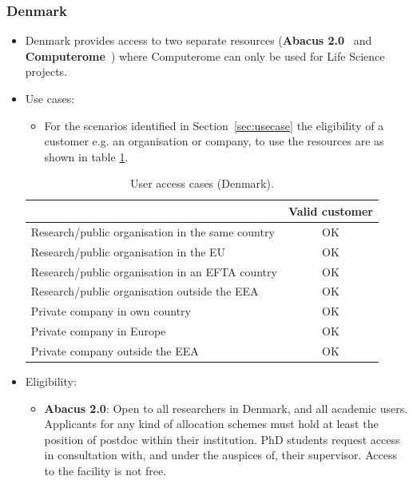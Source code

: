 \documentclass{article}
\begin{document}
\subsubsection{Denmark}
\begin{itemize}
    \item []
Denmark provides access to two separate resources (\textbf{Abacus 2.0}~\cite{abacus} and \textbf{Computerome}~\cite{computerome}) where Computerome can only be used for Life Science projects. 

    \item[] Use cases: 
    \begin{itemize}
        \item[] 
    For the scenarios identified in Section~\ref{sec:usecase} the eligibility of a customer e.g. an organisation or company, to use the resources are as shown in table \ref{tab:DK_use_cases}.
    \end{itemize}
    \begin{table}[!h]
        \centering
        \begin{tabular}{|l|c|}
        \hline
             & Valid customer  \\
        \hline
Research/public organisation in the same country & OK \\
        \hline
Research/public organisation in the EU & OK \\
        \hline
Research/public organisation in an EFTA country & OK \\
        \hline
Research/public organisation outside the EEA & OK\\
        \hline
Private company in own country & OK \\
        \hline
Private company in Europe    & OK \\
        \hline
Private company outside the EEA & OK \\
        \hline 
        \end{tabular}
        \caption{User access cases (Denmark).}
        \label{tab:DK_use_cases}
    \end{table}
    
    \item[]Eligibility:
    \begin{itemize} 
        \item[]\textbf{Abacus 2.0}: Open to all researchers in Denmark, and all academic users. Applicants for any kind of allocation schemes must hold at least the position of postdoc within their institution. PhD students request access in consultation with, and under the auspices of, their supervisor. Access to the facility is not free. 
        

\end{itemize}
\end{itemize}
\end{document}

